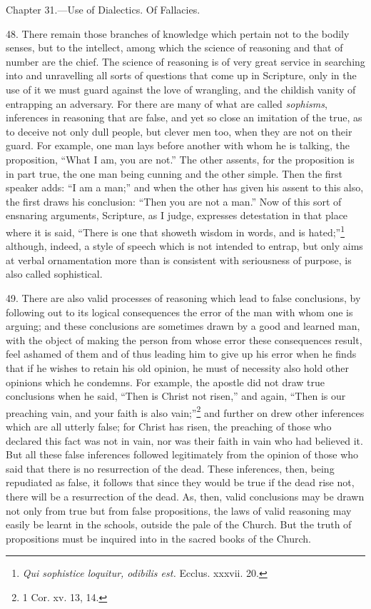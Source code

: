 
Chapter 31.—Use of Dialectics. Of Fallacies.

48. There remain those branches of knowledge which pertain not to the bodily senses, but to the intellect, among which the science of reasoning and that of number are the chief. The science of reasoning is of very great service in searching into and unravelling all sorts of questions that come up in Scripture, only in the use of it we must guard against the love of wrangling, and the childish vanity of entrapping an adversary. For there are many of what are called \emph{sophisms}, inferences in reasoning that are false, and yet so close an imitation of the true, as to deceive not only dull people, but clever men too, when they are not on their guard. For example, one man lays before another with whom he is talking, the proposition, “What I am, you are not.” The other assents, for the proposition is in part true, the one man being cunning and the other simple. Then the first speaker adds: “I am a man;” and when the other has given his assent to this also, the first draws his conclusion: “Then you are not a man.” Now of this sort of ensnaring arguments, Scripture, as I judge, expresses detestation in that place where it is said, “There is one that showeth wisdom in words, and is hated;”\footnote{\emph{Qui sophistice loquitur, odibilis est.} Ecclus. xxxvii. 20.} although, indeed, a style of speech which is not intended to entrap, but  only aims at verbal ornamentation more than is consistent with seriousness of purpose, is also called sophistical.

49. There are also valid processes of reasoning which lead to false conclusions, by following out to its logical consequences the error of the man with whom one is arguing; and these conclusions are sometimes drawn by a good and learned man, with the object of making the person from whose error these consequences result, feel ashamed of them and of thus leading him to give up his error when he finds that if he wishes to retain his old opinion, he must of necessity also hold other opinions which he condemns. For example, the apostle did not draw true conclusions when he said, “Then is Christ not risen,” and again, “Then is our preaching vain, and your faith is also vain;”\footnote{1 Cor. xv. 13, 14.} and further on drew other inferences which are all utterly false; for Christ has risen, the preaching of those who declared this fact was not in vain, nor was their faith in vain who had believed it. But all these false inferences followed legitimately from the opinion of those who said that there is no resurrection of the dead. These inferences, then, being repudiated as false, it follows that since they would be true if the dead rise not, there will be a resurrection of the dead. As, then, valid conclusions may be drawn not only from true but from false propositions, the laws of valid reasoning may easily be learnt in the schools, outside the pale of the Church. But the truth of propositions must be inquired into in the sacred books of the Church.


